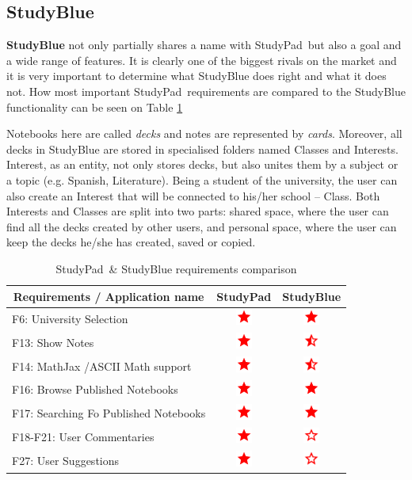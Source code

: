 \documentclass[thesis=B,english]{FITthesis}[2012/10/20]
\newcommand{\appname}{StudyPad}
\newcommand{\present}{\begin{minipage}{.1\textwidth}
\centering
      \includegraphics[width=15pt, height=15pt]{ic_star_black_24dp}
    \end{minipage}}
\newcommand{\limited}{\begin{minipage}{.1\textwidth}
\centering
      \includegraphics[width=15pt, height=15pt]{ic_star_half_black_24dp}
    \end{minipage}}
\newcommand{\absent}{\begin{minipage}{.1\textwidth}
\centering
      \includegraphics[width=15pt, height=15pt]{ic_star_border_black_24dp}
    \end{minipage}}
\begin{document}
\subsection{StudyBlue}

\textbf{StudyBlue} not only partially shares a name with \appname\ but also a goal and a wide range of features. It is clearly one of the biggest rivals on the market and it is very important to determine what StudyBlue does right and what it does not. How most important \appname\ requirements are compared to the StudyBlue functionality can be seen on Table \ref{tab:studyblue}

Notebooks here are called \textit{decks} and notes are represented by \textit{cards}. Moreover, all decks in StudyBlue are stored in specialised folders named Classes and Interests. Interest, as an entity, not only stores decks, but also unites them by a subject or a topic (e.g. Spanish, Literature). Being a student of the university, the user can also create an Interest that will be connected to his/her school -- Class. Both Interests and Classes are split into two parts: shared space, where the user can find all the decks created by other users, and personal space, where the user can keep the decks he/she has created, saved or copied.


\begin{table}[H]
\caption{\appname\ \& StudyBlue requirements comparison}
\label{tab:studyblue}
\begin{tabular}{|l|c|c|}
\hline
\multicolumn{1}{|c|}{\textbf{Requirements / Application name}} & \multicolumn{1}{l|}{\textbf{StudyPad}} & \multicolumn{1}{l|}{\textbf{StudyBlue}} \\ \hline
F6: University Selection                                       & \present                                & \present                                \\ \hline
F13: Show Notes                                                & \present                              & \limited                                \\ \hline
F14: MathJax /ASCII Math support                               & \present                               & \limited                                \\ \hline
F16: Browse Published Notebooks                        & \present                                & \present                               \\ \hline
F17: Searching Fo Published Notebooks                    & \present                                & \present                               \\ \hline
F18-F21: User Commentaries                                     & \present                                & \absent                                \\ \hline
F27: User Suggestions                                          & \present                                & \absent                               \\ \hline
\end{tabular}
\end{table}
\end{document}
